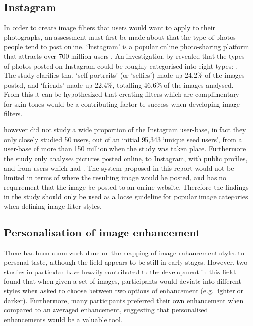 \documentclass[a4paper,12pt]{article}
\begin{document}
  \subsection{Instagram}
    In order to create image filters that users would want to apply to their photographs, an assessment must first be made about that the type of photos people tend to post online. ‘Instagram’ is a popular online photo-sharing platform that attracts over 700 million users \citep{instagram2017users}. An investigation by \cite{hu2014we} revealed that the types of photos posted on Instagram could be roughly categorised into eight types: . The study clarifies that ‘self-portraits’ (or ‘selfies’) made up 24.2\% of the images posted, and ‘friends’ made up 22.4\%, totalling 46.6\% of the images analysed. From this it can be hypothesized that creating filters which are complimentary for skin-tones would be a contributing factor to success when developing image-filters.

    \cite{hu2014we} however did not study a wide proportion of the Instagram user-base, in fact they only closely studied 50 users, out of an initial 95,343 ‘unique seed users’, from a user-base of more than 150 million when the study was taken place. Furthermore the study only analyses pictures posted online, to Instagram, with public profiles, and from users which had . The system proposed in this report would not be limited in terms of where the resulting image would be posted, and has no requirement that the image be posted to an online website. Therefore the findings in the study should only be used as a loose guideline for popular image categories when defining image-filter styles.

  \subsection{Personalisation of image enhancement}
    There has been some work done on the mapping of image enhancement styles to personal taste, although the field appears to be still in early stages. However, two studies in particular have heavily contributed to the development in this field. \cite{kang2010personalization} found that when given a set of images, participants would deviate into different styles when asked to choose between two options of enhancement (e.g. lighter or darker). Furthermore, many participants preferred their own enhancement when compared to an averaged enhancement, suggesting that personalised enhancements would be a valuable tool.
\end{document}
